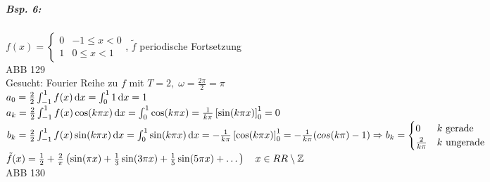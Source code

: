 \subparagraph{Bsp. 6:} $f(x) = \begin{cases}
0 & -1 \leq x < 0\\
1 & 0 \leq x <1
\end{cases}$, $\tilde f$ periodische Fortsetzung\\
ABB 129\\
Gesucht: Fourier Reihe zu $f$ mit $T=2, \; \omega = \frac{2\pi}{2}= \pi$\\
$a_0 = \frac{2}{2} \int_{-1}^1 f(x) \,\mathrm{d}x = \int_0^1 1 \,\mathrm{d}x = 1$\\
$a_k = \frac{2}{2} \int_{-1}^1 f(x) \cos (k \pi x) \,\mathrm{d}x = \int_0^1 \cos (k \pi x) = \frac{1}{k\pi}\left[\sin (k\pi x) \right]_0^1=0$\\
$b_k = \frac{2}{2} \int_{-1}^1 f(x) \sin (k\pi x) \,\mathrm{d}x = \int_0^1 \sin (k\pi x) \,\mathrm{d}x = -\frac{1}{k\pi} \left[ \cos (k \pi x)\right]_0^1 = -\frac{1}{k\pi}(cos(k\pi)-1) \\
\Rightarrow b_k=\begin{cases}
0 & k \text{ gerade}\\
\frac{2}{k\pi} & k \text{ ungerade}\\
\end{cases}$\\
$\tilde f ( x) = \frac{1}{2}+ \frac{2}{\pi} \left(\sin (\pi x) + \frac{1}{3} \sin (3\pi x) + \frac{1}{5} \sin (5 \pi x) + \dots\right) \quad x \in RR\setminus \mathbb{Z}$\\
ABB 130

